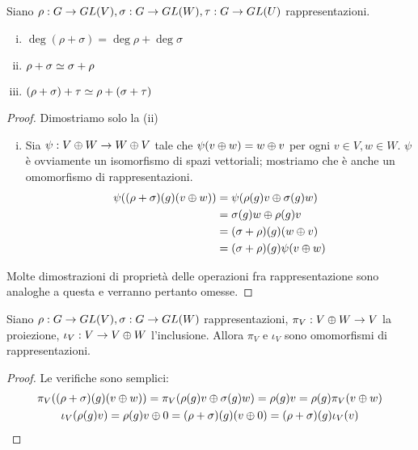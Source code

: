 \begin{proposition}
Siano $\rho:G\to GL(V),\allowbreak\sigma:G\to GL(W),\allowbreak\tau:G\to GL(U)$ rappresentazioni.
\begin{enumerate}[(i)]
\item $\deg(\rho+\sigma)=\deg\rho+\deg\sigma$
\item $\rho+\sigma\simeq\sigma+\rho$
\item $(\rho+\sigma)+\tau\simeq\rho+(\sigma+\tau)$
\end{enumerate}
\end{proposition}
\begin{proof}
Dimostriamo solo la (ii)
\begin{enumerate}[(i)]
\addtocounter{enumi}{1}
\item Sia $\psi:V\oplus W\to W\oplus V$ tale che $\psi(v\oplus w)=w\oplus v$ per ogni $v\in V\comma w\in W$. $\psi$ è ovviamente un isomorfismo di spazi vettoriali; mostriamo che è anche un omomorfismo di rappresentazioni.
\begin{align*}
\psi((\rho+\sigma)(g)(v\oplus w))&=\psi(\rho(g)v\oplus\sigma(g)w)\\
&=\sigma(g)w\oplus\rho(g)v\\
&=(\sigma+\rho)(g)(w\oplus v)\\
&=(\sigma+\rho)(g)\psi(v\oplus w)
\end{align*}
\end{enumerate}
Molte dimostrazioni di proprietà delle operazioni fra rappresentazione sono analoghe a questa e verranno pertanto omesse.
\end{proof}

\begin{proposition}
Siano $\rho:G\to GL(V),\allowbreak\sigma:G\to GL(W)$ rappresentazioni, $\pi_V:V\oplus W\to V$ la proiezione, $\iota_V:V\to V\oplus W$ l'inclusione. Allora $\pi_V$ e $\iota_V$ sono omomorfismi di rappresentazioni.
\end{proposition}
\begin{proof}
Le verifiche sono semplici:
\begin{multline*}
\pi_V((\rho+\sigma)(g)(v\oplus w))=\pi_V(\rho(g)v\oplus\sigma(g)w)=\rho(g)v=\rho(g)\pi_V(v\oplus w)\\
\iota_V(\rho(g)v)=\rho(g)v\oplus 0=(\rho+\sigma)(g)(v\oplus 0)=(\rho+\sigma)(g)\iota_V(v)\\
\end{multline*}
\end{proof}

